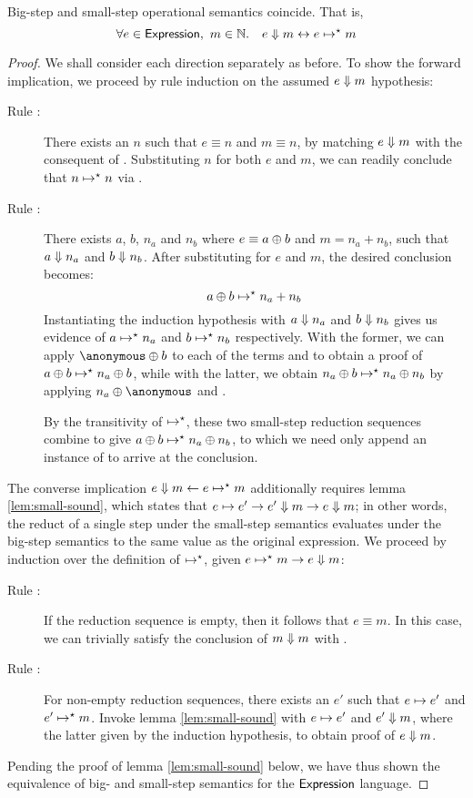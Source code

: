 \begin{theorem}\label{thm:big-small}
Big-step and small-step operational semantics coincide. That is,
\[
	\forall e \in \textsf{Expression},\ m \in \mathbb{N}.\quad
		e \Downarrow m \leftrightarrow e \mapsto^\star m
\]
\end{theorem}
\begin{proof}
We shall consider each direction separately as before. To show the forward
implication, we proceed by rule induction on the assumed $e \Downarrow m$
hypothesis:
\begin{description}
\item[Rule :]%
There exists an $n$ such that $e \equiv n$ and $m \equiv n$, by matching $e
\Downarrow m$ with the consequent of . Substituting $n$ for
both $e$ and $m$, we can readily conclude that $n \mapsto^\star n$ via
.
\item[Rule :]%
There exists $a$, $b$, $n_a$ and $n_b$ where $e \equiv a \oplus b$ and $m
= n_a + n_b$, such that $a \Downarrow n_a$ and $b \Downarrow n_b$. After
substituting for $e$ and $m$, the desired conclusion becomes:
\[
	a \oplus b \mapsto^\star n_a + n_b
\]
Instantiating the induction hypothesis with $a \Downarrow n_a$ and $b
\Downarrow n_b$ gives us evidence of $a \mapsto^\star n_a$ and $b
\mapsto^\star n_b$ respectively. With the former, we can apply $\anonymous
\Add b$ to each of the terms and  to obtain a proof of
$a \oplus b \mapsto^\star n_a \oplus b$, while with the latter, we obtain
$n_a \oplus b \mapsto^\star n_a \oplus n_b$ by applying $n_a \Add
\anonymous$ and .

By the transitivity of $\mapsto^\star$, these two small-step reduction
sequences combine to give $a \oplus b \mapsto^\star n_a \oplus n_b$, to
which we need only append an instance of  to arrive at
the conclusion.
\end{description}

\noindent The converse implication $e \Downarrow m \leftarrow e \mapsto^\star m$
additionally requires lemma \ref{lem:small-sound}, which states that $e
\mapsto e' \rightarrow e' \Downarrow m \rightarrow e \Downarrow m$; in other words, the
reduct of a single step under the small-step semantics evaluates under the
big-step semantics to the same value as the original expression. We proceed
by induction over the definition of $\mapsto^\star$, given $e \mapsto^\star m \rightarrow
e \Downarrow m$:
\begin{description}
\item[Rule :]%
If the reduction sequence is empty, then it follows that $e \equiv m$. In
this case, we can trivially satisfy the conclusion of $m \Downarrow m$ with
.
\item[Rule :]%
For non-empty reduction sequences, there exists an $e'$ such that $e \mapsto
e'$ and $e' \mapsto^\star m$. Invoke lemma \ref{lem:small-sound} with $e
\mapsto e'$ and $e' \Downarrow m$, where the latter given by the induction
hypothesis, to obtain proof of $e \Downarrow m$.
\end{description}
Pending the proof of lemma \ref{lem:small-sound} below, we have thus shown
the equivalence of big- and small-step semantics for the $\textsf{Expression}$
language.
\end{proof}

